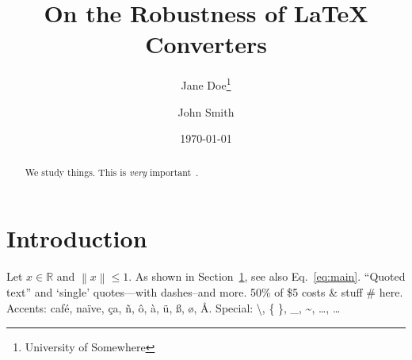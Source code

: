 \documentclass[11pt]{article}
\title{On the Robustness of \LaTeX{} Converters}
\author{Jane Doe\thanks{University of Somewhere} \and John Smith}
\date{\today}
\newcommand{\R}{\mathbb{R}}
\newcommand{\norm}[1]{\left\lVert #1 \right\rVert}
\begin{document}
\maketitle
\begin{abstract}
We study things. This is \emph{very} important~\cite{knuth84}.
\end{abstract}
\tableofcontents
\section{Introduction}\label{sec:intro}
Let $x \in \R$ and $\norm{x} \leq 1$. As shown in Section~\ref{sec:intro}, see also Eq.~\eqref{eq:main}.
``Quoted text'' and `single' quotes---with dashes--and more. 50\% of \$5 costs \& stuff \# here.
Accents: caf\'e, na\"ive, \c{c}a, \~n, \^{o}, \`a, \"{u}, \ss, \o, \AA.
Special: \textbackslash, \{ \}, \_, \textasciitilde, \ldots, \dots
\end{document}

